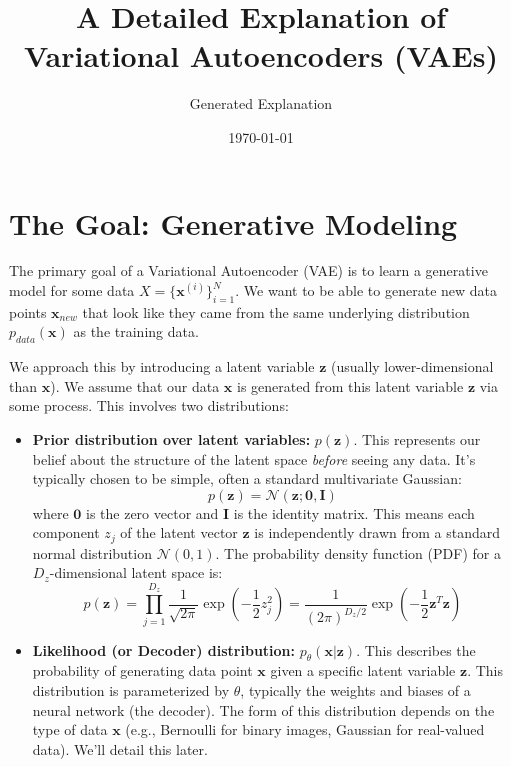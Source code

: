 \documentclass[11pt, letterpaper]{article}
\newcommand{\vx}{\boldsymbol{x}} %
\newcommand{\vz}{\boldsymbol{z}} %
\newcommand{\mI}{\boldsymbol{I}} %
\newcommand{\Ndist}{\mathcal{N}} %
\begin{document}
\title{A Detailed Explanation of Variational Autoencoders (VAEs)}
\author{Generated Explanation}
\date{\today}
\maketitle

\section{The Goal: Generative Modeling}

The primary goal of a Variational Autoencoder (VAE) is to learn a generative model for some data $X = \{\vx^{(i)}\}_{i=1}^N$. We want to be able to generate new data points $\vx_{new}$ that look like they came from the same underlying distribution $p_{data}(\vx)$ as the training data.

We approach this by introducing a latent variable $\vz$ (usually lower-dimensional than $\vx$). We assume that our data $\vx$ is generated from this latent variable $\vz$ via some process. This involves two distributions:

\begin{itemize}
    \item \textbf{Prior distribution over latent variables:} $p(\vz)$. This represents our belief about the structure of the latent space \emph{before} seeing any data. It's typically chosen to be simple, often a standard multivariate Gaussian:
    \begin{equation}
        p(\vz) = \Ndist(\vz; \boldsymbol{0}, \mI)
    \end{equation}
    where $\boldsymbol{0}$ is the zero vector and $\mI$ is the identity matrix. This means each component $z_j$ of the latent vector $\vz$ is independently drawn from a standard normal distribution $\Ndist(0, 1)$. The probability density function (PDF) for a $D_z$-dimensional latent space is:
    \begin{equation}
        p(\vz) = \prod_{j=1}^{D_z} \frac{1}{\sqrt{2\pi}} \exp\left(-\frac{1}{2} z_j^2\right) = \frac{1}{(2\pi)^{D_z/2}} \exp\left(-\frac{1}{2} \vz^T \vz\right)
    \end{equation}

    \item \textbf{Likelihood (or Decoder) distribution:} $p_{\theta}(\vx|\vz)$. This describes the probability of generating data point $\vx$ given a specific latent variable $\vz$. This distribution is parameterized by $\theta$, typically the weights and biases of a neural network (the decoder). The form of this distribution depends on the type of data $\vx$ (e.g., Bernoulli for binary images, Gaussian for real-valued data). We'll detail this later.
\end{itemize}
\end{document}
